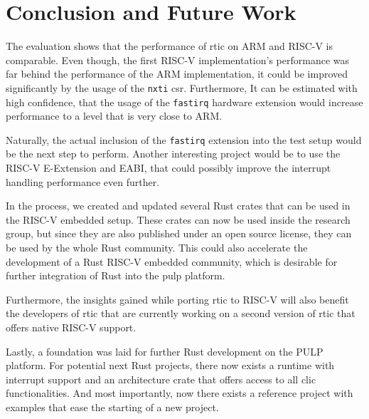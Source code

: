 \chapter{Conclusion and Future Work}
\label{ch:conclusion}
\label{sec:future_work}

The evaluation shows that the performance of \gls{rtic} on ARM and RISC-V is comparable.
Even though, the first RISC-V implementation's performance was far behind the performance of the ARM implementation, it could be improved significantly by the usage of the \texttt{nxti} \gls{csr}. Furthermore, It can be estimated with high confidence, that the usage of the \texttt{fastirq} hardware extension would increase performance to a level that is very close to ARM.

Naturally, the actual inclusion of the \texttt{fastirq} extension into the test setup would be the next step to perform. Another interesting project would be to use the RISC-V E-Extension and EABI, that could possibly improve the interrupt handling performance even further.

In the process, we created and updated several Rust crates that can be used in the RISC-V embedded setup. These crates can now be used inside the research group, but since they are also published under an open source license, they can be used by the whole Rust community. This could also accelerate the development of a Rust RISC-V embedded community, which is desirable for further integration of Rust into the \gls{pulp} platform.

Furthermore, the insights gained while porting \gls{rtic} to RISC-V will also benefit the developers of \gls{rtic} that are currently working on a second version of \gls{rtic} that offers native RISC-V support.

Lastly, a foundation was laid for further Rust development on the PULP platform. For potential next Rust projects, there now exists a runtime with interrupt support and an architecture crate that offers access to all \gls{clic} functionalities. And most importantly, now there exists a reference project with examples that ease the starting of a new project.


